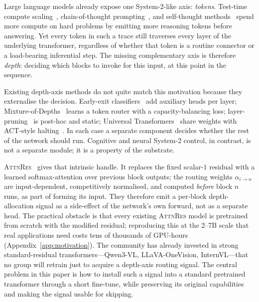 \documentclass{article}
\newcommand{\attnres}{\textsc{AttnRes}}
\begin{document}
Large language models already expose one System-2-like axis: \emph{tokens}. Test-time compute scaling~\citep{openai2024o1, deepseek2025r1, snell2024scaling}, chain-of-thought prompting~\citep{wei2022chain}, and self-thought methods~\citep{zelikman2024quietstar} spend more compute on hard problems by emitting more reasoning tokens before answering. Yet every token in such a trace still traverses every layer of the underlying transformer, regardless of whether that token is a routine connector or a load-bearing inferential step. The missing complementary axis is therefore \emph{depth}: deciding which blocks to invoke for this input, at this point in the sequence.

Existing depth-axis methods do not quite match this motivation because they externalise the decision. Early-exit classifiers~\citep{schuster2022confident, elbayad2020depth} add auxiliary heads per layer; Mixture-of-Depths~\citep{raposo2024mixture} learns a token router with a capacity-balancing loss; layer-pruning~\citep{gromov2024unreasonable, men2024shortgpt} is post-hoc and static; Universal Transformers~\citep{dehghani2018universal} share weights with ACT-style halting~\citep{graves2016adaptive}. In each case a separate component decides whether the rest of the network should run. Cognitive and neural System-2 control, in contrast, is not a separate module; it is a property of the substrate.

\attnres{}~\citep{chen2026attnres} gives that intrinsic handle. It replaces the fixed scalar-$1$ residual with a learned softmax-attention over previous block outputs; the routing weights $\alpha_{i\to n}$ are input-dependent, competitively normalised, and computed \emph{before} block $n$ runs, as part of forming its input. They therefore emit a per-block depth-allocation signal as a side-effect of the network's own forward, not as a separate head. The practical obstacle is that every existing \attnres{} model is pretrained from scratch with the modified residual; reproducing this at the 2--7B scale that real applications need costs tens of thousands of GPU-hours (Appendix~\ref{app:motivation}). The community has already invested in strong standard-residual transformers---Qwen3-VL, LLaVA-OneVision, InternVL---that no group will retrain just to acquire a depth-axis routing signal. The central problem in this paper is how to install such a signal into a standard pretrained transformer through a short fine-tune, while preserving its original capabilities and making the signal usable for skipping.
\end{document}
